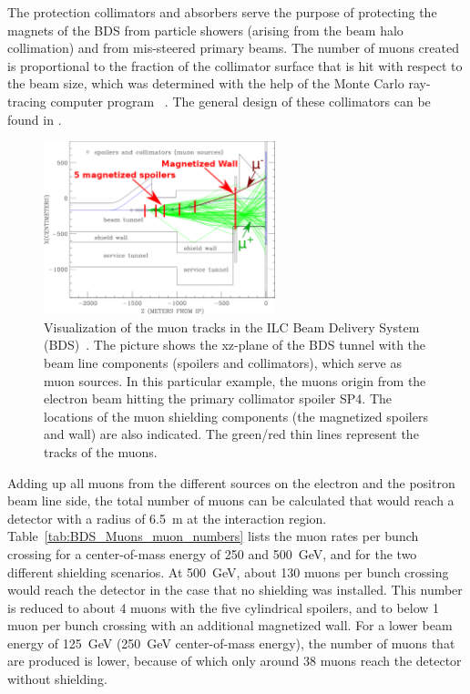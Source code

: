 The protection collimators and absorbers serve the purpose of protecting the magnets of the BDS from particle showers (arising from the beam halo collimation) and from mis-steered primary beams.
The number of muons created is proportional to the fraction of the collimator surface that is hit with respect to the beam size, which was determined with the help of the Monte Carlo ray-tracing computer program \turtle~\cite{Turtle}.
The general design of these collimators can be found in \cite{BDS_coll_design}.
\begin{figure}
\centering
\includegraphics[width=0.6\textwidth]{Figures/BDS_muons/BDS_Tunnel_Spoilers+Wall_edited.png}
\caption[Muon tracks in the Beam Delivery Systems]{Visualization of the muon tracks in the ILC Beam Delivery System (BDS)~\cite{Lewis}.
The picture shows the xz-plane of the BDS tunnel with the beam line components (spoilers and collimators), which serve as muon sources.
In this particular example, the muons origin from the electron beam hitting the primary collimator spoiler SP4.
The locations of the muon shielding components (the magnetized spoilers and wall) are also indicated.
The green/red thin lines represent the tracks of the muons.}
\label{fig:BDS_Muons:tracks}
\end{figure}
Adding up all muons from the different sources on the electron and the positron beam line side, the total number of muons can be calculated that would reach a detector with a radius of \SI{6.5}{\meter} at the interaction region.
Table~\ref{tab:BDS_Muons_muon_numbers} lists the muon rates per bunch crossing for a center-of-mass energy of 250 and \SI{500}{\GeV}, and for the two different shielding scenarios.
At \SI{500}{\GeV}, about 130 muons per bunch crossing would reach the detector in the case that no shielding was installed.
This number is reduced to about 4 muons with the five cylindrical spoilers, and to below 1 muon per bunch crossing with an additional magnetized wall.
For a lower beam energy of \SI{125}{\GeV} (\SI{250}{\GeV} center-of-mass energy), the number of muons that are produced is lower, because of which only around 38 muons reach the detector without shielding.
